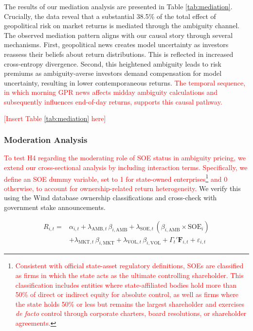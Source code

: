 \documentclass[preprint,12pt,authoryear]{elsarticle}
\begin{document}
The results of our mediation analysis are presented in Table \ref{tab:mediation}. Crucially, the data reveal that a substantial 38.5\% of the total effect of geopolitical risk on market returns is mediated through the ambiguity channel. The observed mediation pattern aligns with our causal story through several mechanisms. First, geopolitical news creates model uncertainty as investors reassess their beliefs about return distributions. This is reflected in increased cross-entropy divergence. Second, this heightened ambiguity leads to risk premiums as ambiguity-averse investors demand compensation for model uncertainty, resulting in lower contemporaneous returns. \textcolor{red}{The temporal sequence, in which morning GPR news affects midday ambiguity calculations and subsequently influences end-of-day returns, supports this causal pathway.}

\textcolor{red}{[Insert Table \ref{tab:mediation} here]}

\subsubsection{Moderation Analysis}

\textcolor{red}{To test H4 regarding the moderating role of SOE status in ambiguity pricing, we extend our cross-sectional analysis by including interaction terms. Specifically, we define an SOE dummy variable, set to 1 for state-owned enterprises\footnote{\textcolor{red}{Consistent with official state-asset regulatory definitions, SOEs are classified as firms in which the state acts as the ultimate controlling shareholder. This classification includes entities where state-affiliated bodies hold more than 50\% of direct or indirect equity for absolute control, as well as firms where the state holds 50\% or less but remains the largest shareholder and exercises \textit{de facto} control through corporate charters, board resolutions, or shareholder agreements.}} and 0 otherwise, to account for ownership-related return heterogeneity.} We verify this using the Wind database ownership classifications and cross-check with government stake announcements.

\begin{equation}
\begin{split}
R_{i,t} = & \alpha_{i,t} + \lambda_{\text{AMB},t} \, \beta_{i,\text{AMB}} + \lambda_{\text{SOE},t} \, (\beta_{i,\text{AMB}} \times \text{SOE}_i) \\ 
&+ \lambda_{\text{MKT},t} \, \beta_{i,\text{MKT}} + \lambda_{\text{VOL},t} \, \beta_{i,\text{VOL}} + \Gamma_{t}' \mathbf{F}_{i,t} + \varepsilon_{i,t}
\end{split}
\end{equation}
\end{document}
